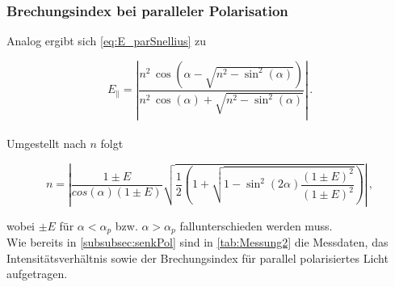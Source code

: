 \subsubsection{Brechungsindex bei paralleler Polarisation}

Analog ergibt sich \eqref{eq:E_parSnellius} zu

\begin{equation*}
    E_\parallel = \left| \frac{n^2 \, \cos(\alpha - \sqrt{n^2 - \sin^2(\alpha)})}{n^2 \, \cos(\alpha) + \sqrt{n^2 - \sin^2(\alpha)}} \right| \,.
\end{equation*} \\

Umgestellt nach $n$ folgt

\begin{equation}
    n  = \left| \frac{1 \pm E}{cos(\alpha) (1 \pm E)} \sqrt{\frac{1}{2} 
    \left(1 + \sqrt{1 - \sin^2(2 \alpha) \frac{(1 \pm E)^2}{(1 \pm E)^2}} \right)} \right| \,,
\end{equation}

wobei $\pm E$ für $\alpha < \alpha_p$ bzw. $\alpha > \alpha_p$ fallunterschieden werden muss. \\

Wie bereits in \autoref{subsubsec:senkPol} sind in \autoref{tab:Messung2} die Messdaten, das Intensitätsverhältnis sowie der Brechungsindex für parallel polarisiertes Licht aufgetragen.


